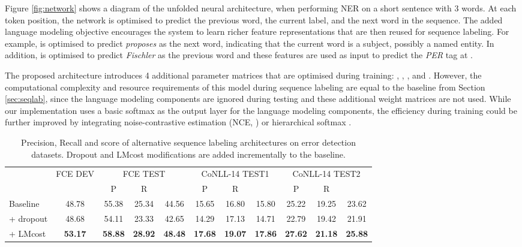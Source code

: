 \documentclass[11pt,a4paper]{article}
\begin{document}
Figure \ref{fig:network} shows a diagram of the unfolded neural architecture, when performing NER on a short sentence with 3 words. 
At each token position, the network is optimised to predict the previous word, the current label, and the next word in the sequence.
The added language modeling objective encourages the system to learn richer feature representations that are then reused for sequence labeling.
For example,  is optimised to predict \textit{proposes} as the next word, indicating that the current word is a subject, possibly a named entity.
In addition,  is optimised to predict \textit{Fischler} as the previous word and these features are used as input to predict the \textit{PER} tag at . 




The proposed architecture introduces 4 additional parameter matrices that are optimised during training: ,  ,  , and . However, the computational complexity and resource requirements of this model during sequence labeling are equal to the baseline from Section \ref{sec:seqlab}, since the language modeling components are ignored during testing and these additional weight matrices are not used.
While our implementation uses a basic softmax as the output layer for the language modeling components, the efficiency during training could be further improved by integrating noise-contrastive estimation (NCE, ) or hierarchical softmax \cite{Morin}.


\begin{table*}[t]
\setlength\tabcolsep{6.5pt}
\begin{tabular}{l|c|ccc|ccc|ccc} \toprule
 & \multicolumn{1}{c|}{FCE DEV} & \multicolumn{3}{c|}{FCE TEST} & \multicolumn{3}{c|}{CoNLL-14 TEST1} & \multicolumn{3}{c}{CoNLL-14 TEST2} \\ 
 & {\small } & {\small P} & {\small R} & {\small } & {\small P} & {\small R} & {\small } & {\small P} & {\small R} & {\small } \\\midrule
Baseline & 48.78 & 55.38 & 25.34 & 44.56 & 15.65 & 16.80 & 15.80 & 25.22 & 19.25 & 23.62\\
+ dropout & 48.68 & 54.11 & 23.33 & 42.65 & 14.29 & 17.13 & 14.71 & 22.79 & 19.42 & 21.91\\
+ LMcost & \textbf{53.17} & \textbf{58.88} & \textbf{28.92} & \textbf{48.48} & \textbf{17.68} & \textbf{19.07} & \textbf{17.86} & \textbf{27.62} & \textbf{21.18} & \textbf{25.88} \\ \bottomrule
\end{tabular}
\caption{Precision, Recall and  score of alternative sequence labeling architectures on error detection datasets. Dropout and LMcost modifications are added incrementally to the baseline.}
\label{tab:results1}
\end{table*}
\end{document}
